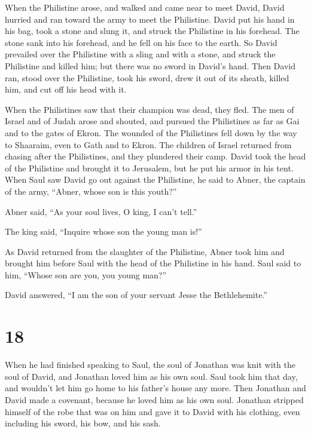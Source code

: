  When the Philistine arose, and walked and came near to
meet David, David hurried and ran toward the army to meet the
Philistine.  David put his hand in his bag, took a stone
and slung it, and struck the Philistine in his forehead. The stone sank
into his forehead, and he fell on his face to the earth. 
So David prevailed over the Philistine with a sling and with a stone,
and struck the Philistine and killed him; but there was no sword in
David's hand.  Then David ran, stood over the Philistine,
took his sword, drew it out of its sheath, killed him, and cut off his
head with it.

When the Philistines saw that their champion was dead, they fled.
 The men of Israel and of Judah arose and shouted, and
pursued the Philistines as far as Gai and to the gates of Ekron. The
wounded of the Philistines fell down by the way to Shaaraim, even to
Gath and to Ekron.  The children of Israel returned from
chasing after the Philistines, and they plundered their camp.
 David took the head of the Philistine and brought it to
Jerusalem, but he put his armor in his tent.  When Saul saw
David go out against the Philistine, he said to Abner, the captain of
the army, ``Abner, whose son is this youth?''

Abner said, ``As your soul lives, O king, I can't tell.''

 The king said, ``Inquire whose son the young man is!''

 As David returned from the slaughter of the Philistine,
Abner took him and brought him before Saul with the head of the
Philistine in his hand.  Saul said to him, ``Whose son are
you, you young man?''

David answered, ``I am the son of your servant Jesse the Bethlehemite.''

\hypertarget{section-17}{%
\section{18}\label{section-17}}

 When he had finished speaking to Saul, the soul of Jonathan
was knit with the soul of David, and Jonathan loved him as his own soul.
 Saul took him that day, and wouldn't let him go home to his
father's house any more.  Then Jonathan and David made a
covenant, because he loved him as his own soul.  Jonathan
stripped himself of the robe that was on him and gave it to David with
his clothing, even including his sword, his bow, and his sash.

